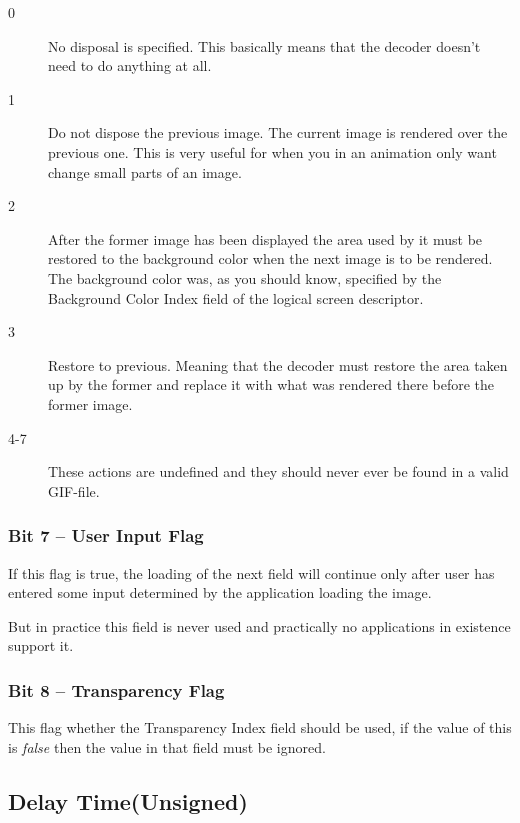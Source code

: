 \begin{refsection}
  \begin{description}

  \item[0] No disposal is specified. This basically means that
    the decoder doesn't need to do anything at all.

  \item[1] Do not dispose the previous image. The current image is
    rendered over the previous one. This is very useful for when you
    in an animation only want change small parts of an image.

  \item[2] After the former image has been displayed the area used by
    it must be restored to the background color when the next image is
    to be rendered. The background color was, as you should know,
    specified by the Background Color Index field of the logical
    screen descriptor.

  \item[3] Restore to previous. Meaning that the decoder must restore
    the area taken up by the former and replace it with what was
    rendered there before the former image. 

  \item[4-7] These actions are undefined and they should never ever be
    found in a valid GIF-file.
  \end{description}

  \subsubsection{Bit 7  -- User Input Flag}

  If this flag is true, the loading of the next field will continue
  only after user has entered some input determined by the application
  loading the image.

  But in practice this field is never used and practically no applications
  in existence support it.

  \subsubsection{Bit 8 -- Transparency Flag }

  This flag whether the Transparency Index field should be used, if
  the value of this is \textit{false} then the value in that field must be
  ignored.

  \subsection{Delay Time(Unsigned)}


\end{refsection}
